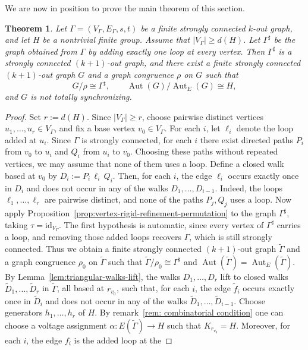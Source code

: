 \documentclass[a4paper,10pt]{amsart}
\theoremstyle{plain}
\newtheorem{theorem}{Theorem}[section]
\theoremstyle{definition}
\DeclareMathOperator{\Aut}{Aut}
\newcommand{\id}{\mathrm{id}}
\begin{document}
We are now in position to prove the main theorem of this section.
\begin{theorem}\label{thm:one-loop-per-vertex}
Let $\Gamma=(V_\Gamma,E_\Gamma,s,t)$ be a finite strongly connected $k$-out graph, and let $H$ be a nontrivial finite group. Assume that $|V_\Gamma|\ge d(H)$. Let $\Gamma^\sharp$ be the graph obtained from $\Gamma$ by adding exactly one loop at every vertex. Then $\Gamma^\sharp$ is a strongly connected $(k+1)$-out graph, and there exist a finite strongly connected $(k+1)$-out graph $G$ and a graph congruence $\rho$ on $G$ such that
\[
G/\rho\cong \Gamma^\sharp,\qquad \Aut(G)/\Aut_E(G)\cong H,
\]
and $G$ is not totally synchronizing.
\end{theorem}
\begin{proof}
Set $r:=d(H)$. Since $|V_\Gamma|\ge r$, choose pairwise distinct vertices $u_1,\dots,u_r\in V_\Gamma$, and fix a base vertex $v_0\in V_\Gamma$. For each $i$, let $\ell_i$ denote the loop added at $u_i$. Since $\Gamma$ is strongly connected, for each $i$ there exist directed paths $P_i$ from $v_0$ to $u_i$ and $Q_i$ from $u_i$ to $v_0$. Choosing these paths without repeated vertices, we may assume that none of them uses a loop. Define a closed walk based at $v_0$ by $D_i:=P_i\,\ell_i\,Q_i$. Then, for each $i$, the edge $\ell_i$ occurs exactly once in $D_i$ and does not occur in any of the walks $D_1,\dots,D_{i-1}$. Indeed, the loops $\ell_1,\dots,\ell_r$ are pairwise distinct, and none of the
paths $P_j,Q_j$ uses a loop. Now apply Proposition~\ref{prop:vertex-rigid-refinement-permutation} to the graph $\Gamma^\sharp$, taking $\tau=\id_{V_\Gamma}$. The first hypothesis is automatic, since every vertex of $\Gamma^\sharp$ carries a loop, and removing those added loops recovers $\Gamma$, which is still strongly connected. Thus we obtain a finite strongly connected $(k+1)$-out graph $\widetilde\Gamma$ and a graph congruence $\rho_0$ on $\widetilde\Gamma$ such that $\widetilde\Gamma/\rho_0\cong \Gamma^\sharp$ and $\Aut(\widetilde\Gamma)=\Aut_E(\widetilde\Gamma)$. By Lemma~\ref{lem:triangular-walks-lift}, the walks
$D_1,\dots,D_r$ lift to closed walks
$\widetilde D_1,\dots,\widetilde D_r$ in $\widetilde\Gamma$, all based
at $r_{v_0}$, such that, for each $i$, the edge $\widetilde f_i$
occurs exactly once in $\widetilde D_i$ and does not occur in any of
the walks $\widetilde D_1,\dots,\widetilde D_{i-1}$. Choose generators $h_1,\dots,h_r$ of $H$. By remark~\ref{rem: combinatorial condition} one can choose a voltage assignment $\alpha:E(\widetilde\Gamma)\to H$ such that $K_{r_{v_0}}=H$. Moreover, for each $i$, the edge $f_i$ is the added loop at the

\end{proof}
\end{document}
